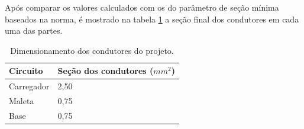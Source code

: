 \par Após comparar os valores calculados com os do parâmetro de seção mínima baseados na norma, é mostrado na tabela \ref{tab:condutores} a seção final dos condutores em cada uma das partes.

\begin{center}
\begin{table}[H]
\centering
\begin{tabular}{ |m{5cm}|m{5cm}|} 
\hline
\textbf{ Circuito }&\textbf{ Seção dos condutores ($mm^2$)}\\ 
 \hline
 Carregador & 2,50 \\ 
 \hline
 Maleta & 0,75 \\
 \hline
Base & 0,75  \\ 
 \hline
\end{tabular}
\caption{Dimensionamento dos condutores do projeto.}
\label{tab:condutores}
\end{table}
\end{center}




